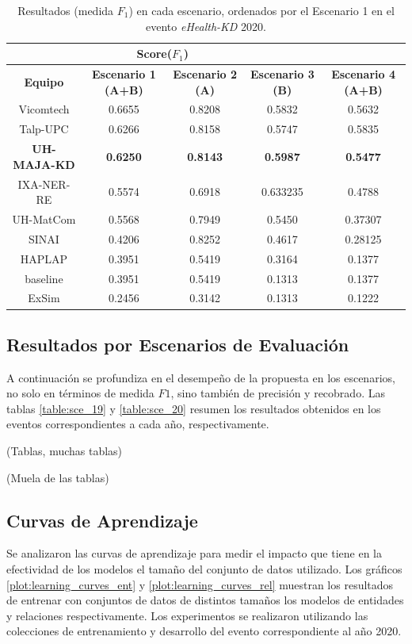 \begin{table}[tb!]\centering
	\caption{Resultados (medida $F_1$) en cada escenario, ordenados por el Escenario 1 en el evento \textit{eHealth-KD} 2020. \label{table:results_19}}
	\begin{tabular}{|c|c|c|c|c|}
		\hline
		&  \multicolumn{2}{c|}{\textbf{Score($F_1$)}} \\
		\hline
		\textbf{Equipo} & \textbf{Escenario 1 (A+B)} & \textbf{Escenario 2 (A)} & \textbf{Escenario 3 (B)} &  \textbf{Escenario 4 (A+B)}\\
		\hline
		Vicomtech & 0.6655 & 0.8208 & 0.5832 & 0.5632 \\
		Talp-UPC & 0.6266 & 0.8158 & 0.5747 & 0.5835  \\
		\textbf{UH-MAJA-KD} & \textbf{0.6250} & \textbf{0.8143} & \textbf{0.5987} & \textbf{0.5477} \\
		IXA-NER-RE & 0.5574 & 0.6918 & 0.633235 & 0.4788 \\
		UH-MatCom &	0.5568 & 0.7949 & 0.5450 & 0.37307 \\
		SINAI &	0.4206 & 0.8252 & 0.4617 & 0.28125 \\
		HAPLAP & 0.3951 & 0.5419 & 0.3164 & 0.1377 \\
		baseline & 0.3951 & 0.5419 & 0.1313 & 0.1377 \\
		ExSim &	0.2456 & 0.3142 & 0.1313 & 0.1222 \\
		\hline
	\end{tabular}
\end{table}


\subsection{Resultados por Escenarios de Evaluación}

A continuación se profundiza en el desempeño de la propuesta en los escenarios, no solo en términos de medida $F1$, sino también de precisión y recobrado.
Las tablas \ref{table:sce_19} y \ref{table:sce_20} resumen los resultados obtenidos en los eventos correspondientes a cada año, respectivamente.

(Tablas, muchas tablas)

(Muela de las tablas)

\subsection{Curvas de Aprendizaje}

Se analizaron las curvas de aprendizaje para medir el impacto que tiene en la efectividad de los modelos el tamaño del conjunto de datos utilizado.
Los gráficos \ref{plot:learning_curves_ent} y \ref{plot:learning_curves_rel} muestran los resultados de entrenar con conjuntos de datos de distintos tamaños los modelos de entidades y relaciones respectivamente.
Los experimentos se realizaron utilizando las colecciones de entrenamiento y desarrollo del evento correspondiente al año 2020.

